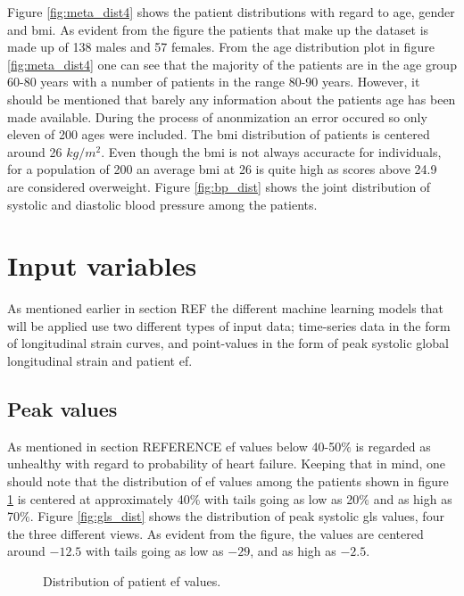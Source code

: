 Figure \ref{fig:meta_dist4} shows the patient distributions with regard to age, gender and \acrshort{bmi}. As evident from the figure the patients that make up the dataset is made up of 138 males and 57 females. From the age distribution plot in figure \ref{fig:meta_dist4} one can see that the majority of the patients are in the age group 60-80 years with a number of patients in the range 80-90 years. However, it should be mentioned that barely any information about the patients age has been made available. During the process of anonmization an error occured so only eleven of 200 ages were included. The \acrshort{bmi} distribution of patients is centered around 26 $kg/m^2$. Even though the \acrshort{bmi} is not always accuracte for individuals, for a population of 200 an average \acrshort{bmi} at 26 is quite high as scores above 24.9 are considered overweight. Figure \ref{fig:bp_dist} shows the joint distribution of systolic and diastolic blood pressure among the patients. \bigskip

\section{Input variables} \label{sec:covariates}
As mentioned earlier in section REF the different machine learning models that will be applied use two different types of input data; time-series data in the form of longitudinal strain curves, and point-values in the form of peak systolic global longitudinal strain and patient \acrshort{ef}. \bigskip

\subsection{Peak values}
As mentioned in section REFERENCE \acrshort{ef} values below 40-50$\%$ is regarded as unhealthy with regard to probability of heart failure. Keeping that in mind, one should note that the distribution of \acrshort{ef} values among the patients shown in figure \ref{fig:EF_dist} is centered at approximately 40$\%$ with tails going as low as 20$\%$ and as high as 70$\%$. Figure \ref{fig:gls_dist} shows the distribution of peak systolic \acrshort{gls} values, four the three different views. As evident from the figure, the values are centered around $-12.5$ with tails going as low as $-29$, and as high as $-2.5$. \bigskip

\begin{figure}[h]
    \centering
    
    \caption{Distribution of patient \acrshort{ef} values.}
    \label{fig:EF_dist}
\end{figure}

